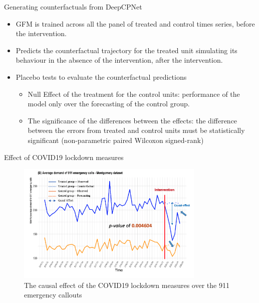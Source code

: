 \documentclass{beamer}
\begin{document}
\begin{frame}{Generating counterfactuals from DeepCPNet}
	\begin{itemize}
	\item GFM is trained across all the panel of treated and control times series, before the intervention.
	\vspace{2mm}
	\item Predicts the counterfactual trajectory for the treated unit simulating its behaviour in the absence of the intervention, after the intervention.
	\vspace{2mm}
	\item Placebo tests to evaluate the counterfactual predictions
	\begin{itemize}\color{blue}
		\item Null Effect of the treatment for the control units: performance of the model only over the forecasting of the control group.
		\item The significance of the differences between the effects: the difference between the errors from treated and control units must be statistically significant (non-parametric paired Wilcoxon signed-rank)
	\end{itemize}
\end{itemize}
\end{frame} 


\begin{frame}{Effect of COVID19 lockdown measures}
\begin{figure}[htbp]
\centerline{\includegraphics[width=0.80\textwidth]{images/911calls}}
\caption{ \scriptsize The causal effect of the COVID19 lockdown measures over the 911 emergency callouts~\cite{Grecov2021-ws}}
\label{causal}
\end{figure}
\end{frame}
\end{document}
